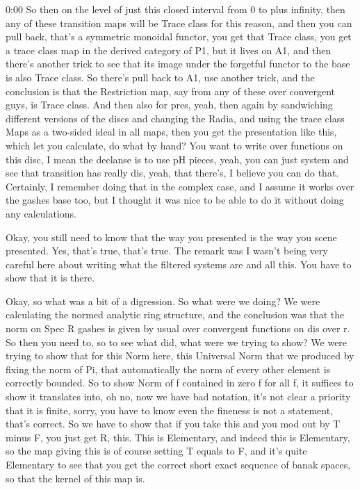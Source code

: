 \begin{unfinished}{0:00}
So then on the level of just this closed interval from 0 to plus infinity, then any of these transition maps will be Trace class for this reason, and then you can pull back, that's a symmetric monoidal functor, you get that Trace class, you get a trace class map in the derived category of P1, but it lives on A1, and then there's another trick to see that its image under the forgetful functor to the base is also Trace class. So there's pull back to A1, use another trick, and the conclusion is that the Restriction map, say from any of these over convergent guys, is Trace class. And then also for pres, yeah, then again by sandwiching different versions of the discs and changing the Radia, and using the trace class Maps as a two-sided ideal in all maps, then you get the presentation like this, which let you calculate, do what by hand? You want to write over functions on this disc, I mean the declanse is to use pH pieces, yeah, you can just system and see that transition has really dis, yeah, that there's, I believe you can do that. Certainly, I remember doing that in the complex case, and I assume it works over the gashes base too, but I thought it was nice to be able to do it without doing any calculations.

Okay, you still need to know that the way you presented is the way you scene presented. Yes, that's true, that's true. The remark was I wasn't being very careful here about writing what the filtered systems are and all this. You have to show that it is there.

Okay, so what was a bit of a digression. So what were we doing? We were calculating the normed analytic ring structure, and the conclusion was that the norm on Spec R gashes is given by usual over convergent functions on dis over r. So then you need to, so to see what did, what were we trying to show? We were trying to show that for this Norm here, this Universal Norm that we produced by fixing the norm of Pi, that automatically the norm of every other element is correctly bounded. So to show Norm of f contained in zero f for all f, it suffices to show it translates into, oh no, now we have bad notation, it's not clear a priority that it is finite, sorry, you have to know even the fineness is not a statement, that's correct. So we have to show that if you take this and you mod out by T minus F, you just get R, this. This is Elementary, and indeed this is Elementary, so the map giving this is of course setting T equals to F, and it's quite Elementary to see that you get the correct short exact sequence of banak spaces, so that the kernel of this map is.


\end{unfinished}
